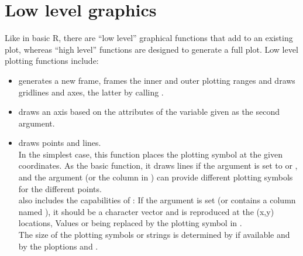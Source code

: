 \documentclass[11pt]{article}\usepackage[]{graphicx}\usepackage[]{color}
\begin{document}


\section{Low level graphics}

Like in basic R, there are ``low level'' graphical functions that
add to an existing plot, whereas ``high level'' functions are designed to 
generate a full plot. Low level plotting functions include:

\begin{itemize}
\item 
{} generates a new frame, frames the inner and outer plotting
ranges and draws gridlines and axes, the latter by calling . 
\item
   draws an axis based on the attributes of the variable given as
  the second argument.   
\item
{} draws points and lines. \\
  In the simplest case, this function places the plotting symbol at the
  given coordinates. As the basic  function, it draws lines if 
  the argument  is set to  or , and the argument
   (or the column  in ) can provide
  different plotting symbols for the different points.\\
   also includes the capabilities of : 
  If the argument  
  is set (or  contains a column named ),
  it should be a character vector and is reproduced at the (x,y) locations,
  Values  or  being replaced by the plotting symbol in .\\
  The size of the plotting symbols or strings is determined by
   if available and by the ploptions
   and .


\end{itemize}
\end{document}

